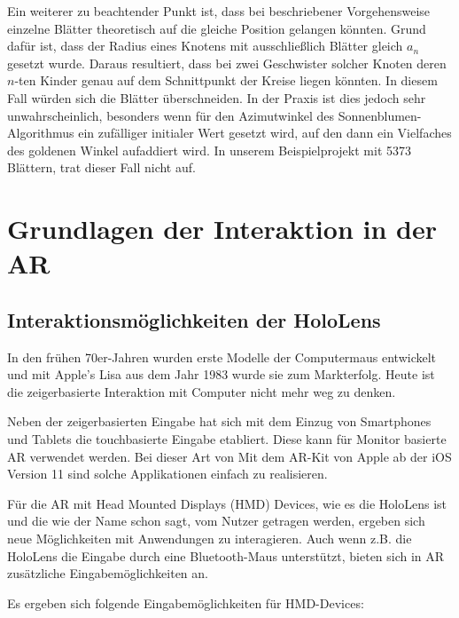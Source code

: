 Ein weiterer zu beachtender Punkt ist, dass bei beschriebener Vorgehensweise einzelne Blätter theoretisch auf die gleiche Position gelangen könnten. Grund dafür ist, dass der Radius eines Knotens mit ausschließlich Blätter gleich $a_n$ gesetzt wurde. Daraus resultiert, dass bei zwei Geschwister solcher Knoten deren $n$-ten Kinder genau auf dem Schnittpunkt der Kreise liegen könnten. In diesem Fall würden sich die Blätter überschneiden. In der Praxis ist dies jedoch sehr unwahrscheinlich, besonders wenn für den Azimutwinkel des Sonnenblumen-Algorithmus ein zufälliger initialer Wert gesetzt wird, auf den dann ein Vielfaches des goldenen Winkel aufaddiert wird. In unserem Beispielprojekt mit 5373 Blättern, trat dieser Fall nicht auf.


\chapter{Grundlagen der Interaktion in der AR}
\label{ch:interaction-ar}

\section{Interaktionsmöglichkeiten der HoloLens}
\label{sec:interaction-hololens}

In den frühen 70er-Jahren wurden erste Modelle der Computermaus entwickelt und mit Apple's Lisa aus dem Jahr 1983 wurde sie zum Markterfolg. Heute ist die zeigerbasierte Interaktion mit Computer nicht mehr weg zu denken.

Neben der zeigerbasierten Eingabe hat sich mit dem Einzug von Smartphones und Tablets die touchbasierte Eingabe etabliert. Diese kann für Monitor basierte AR verwendet werden. Bei dieser Art von Mit dem AR-Kit von Apple ab der iOS Version 11 sind solche Applikationen einfach zu realisieren.

Für die AR mit Head Mounted Displays (HMD) Devices, wie es die HoloLens ist und die wie der Name schon sagt, vom Nutzer getragen werden, ergeben sich neue Möglichkeiten mit Anwendungen zu interagieren. Auch wenn z.B. die HoloLens die Eingabe durch eine Bluetooth-Maus unterstützt, bieten sich in AR zusätzliche Eingabemöglichkeiten an.

Es ergeben sich folgende Eingabemöglichkeiten für HMD-Devices:

